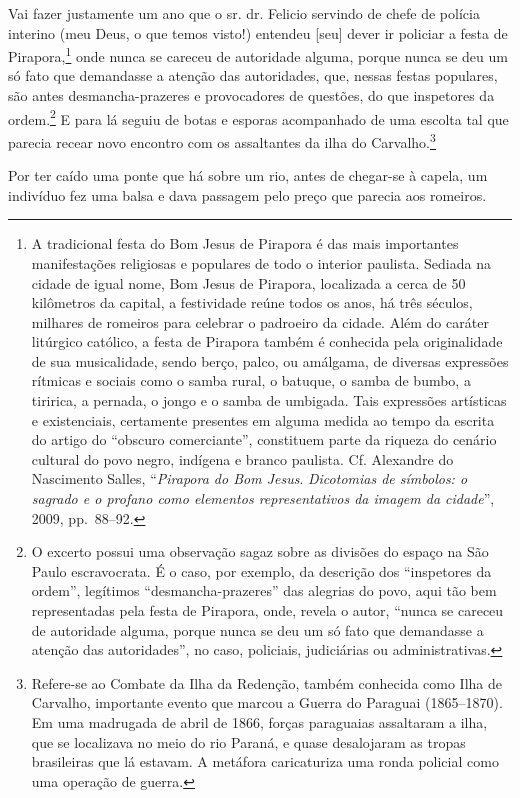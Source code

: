 Vai fazer justamente um ano que o sr. dr. Felicio servindo de chefe de
polícia interino (meu Deus, o que temos visto!) entendeu {[}seu{]} dever
ir policiar a festa de Pirapora,\footnote{ A tradicional festa do Bom
  Jesus de Pirapora é das mais importantes manifestações religiosas e
  populares de todo o interior paulista. Sediada na cidade de igual
  nome, Bom Jesus de Pirapora, localizada a cerca de 50 kilômetros da
  capital, a festividade reúne todos os anos, há três séculos, milhares
  de romeiros para celebrar o padroeiro da cidade. Além do caráter
  litúrgico católico, a festa de Pirapora também é conhecida pela
  originalidade de sua musicalidade, sendo berço, palco, ou amálgama, de
  diversas expressões rítmicas e sociais como o samba rural, o batuque,
  o samba de bumbo, a tiririca, a pernada, o jongo e o samba de
  umbigada. Tais expressões artísticas e existenciais, certamente
  presentes em alguma medida ao tempo da escrita do artigo do ``obscuro
  comerciante'', constituem parte da riqueza do cenário cultural do povo
  negro, indígena e branco paulista. Cf. Alexandre do Nascimento Salles,
  ``\emph{Pirapora do Bom Jesus}. \emph{Dicotomias de símbolos: o sagrado
  e o profano como elementos representativos da imagem da cidade}'',
  2009, pp.~88--92.} onde nunca se careceu de autoridade alguma, porque
nunca se deu um só fato que demandasse a atenção das autoridades, que,
nessas festas populares, são antes desmancha-prazeres e provocadores de
questões, do que inspetores da ordem.\footnote{ O excerto possui uma
  observação sagaz sobre as divisões do espaço na São Paulo
  escravocrata. É o caso, por exemplo, da descrição dos ``inspetores da
  ordem'', legítimos ``desmancha-prazeres'' das alegrias do povo, aqui tão
  bem representadas pela festa de Pirapora, onde, revela o autor, ``nunca
  se careceu de autoridade alguma, porque nunca se deu um só fato que
  demandasse a atenção das autoridades'', no caso, policiais, judiciárias
  ou administrativas.} E para lá seguiu de botas e esporas acompanhado
de uma escolta tal que parecia recear novo encontro com os assaltantes
da ilha do Carvalho.\footnote{ Refere-se ao Combate da Ilha da
  Redenção, também conhecida como Ilha de Carvalho, importante evento
  que marcou a Guerra do Paraguai (1865--1870). Em uma madrugada de abril
  de 1866, forças paraguaias assaltaram a ilha, que se localizava no
  meio do rio Paraná, e quase desalojaram as tropas brasileiras que lá
  estavam. A metáfora caricaturiza uma ronda policial como uma operação
  de guerra.}

Por ter caído uma ponte que há sobre um rio, antes de chegar-se à
capela, um indivíduo fez uma balsa e dava passagem pelo preço que
parecia aos romeiros.


